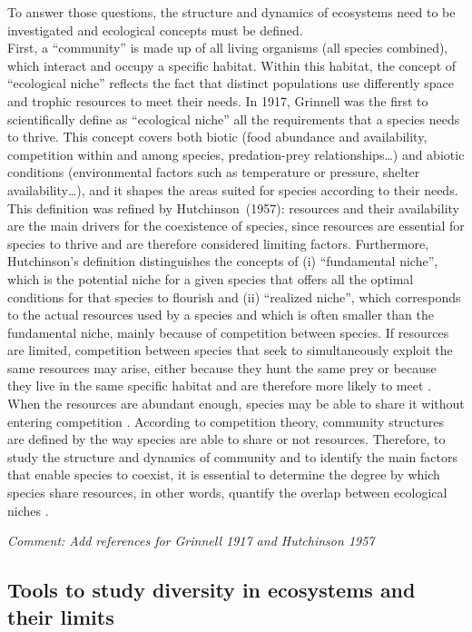 To answer those questions, the structure and dynamics of ecosystems need to be investigated and ecological concepts must be defined.\\ First, a ``community'' is made up of all living organisms (all species combined), which interact and occupy a specific habitat. Within this habitat, the concept of ``ecological niche'' reflects the fact that distinct populations use differently space and trophic resources to meet their needs. In 1917, Grinnell was the first to scientifically define as ``ecological niche'' all the requirements that a species needs to thrive. This concept covers both biotic (food abundance and availability, competition within and among species, predation-prey relationships\ldots{}) and abiotic conditions (environmental factors such as temperature or pressure, shelter availability\ldots{}), and it shapes the areas suited for species according to their needs. This definition was refined by Hutchinson~(1957): resources and their availability are the main drivers for the coexistence of species, since resources are essential for species to thrive and are therefore considered limiting factors. Furthermore, Hutchinson’s definition distinguishes the concepts of (i) ``fundamental niche'', which is the potential niche for a given species that offers all the optimal conditions for that species to flourish and (ii) ``realized niche'', which corresponds to the actual resources used by a species and which is often smaller than the fundamental niche, mainly because of competition between species. If resources are limited, competition between species that seek to simultaneously exploit the same resources may arise, either because they hunt the same prey or because they live in the same specific habitat and are therefore more likely to meet \citep{blondel1979}. When the resources are abundant enough, species may be able to share it without entering competition \citep{nagelkerke2018}. According to competition theory, community structures are defined by the way species are able to share or not resources. Therefore, to study the structure and dynamics of community and to identify the main factors that enable species to coexist, it is essential to determine the degree by which species share resources, in other words, quantify the overlap between ecological niches \citep{geange2011}.

\emph{Comment: Add references for Grinnell 1917 and Hutchinson 1957}

\subsection{Tools to study diversity in ecosystems and their limits}

